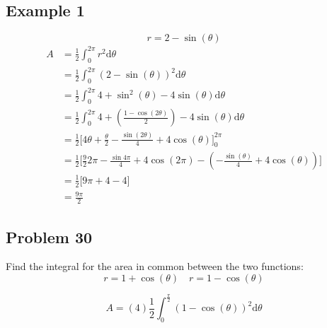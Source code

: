 \documentclass[letterpaper, 12pt]{article}
\newcommand*{\diff}{\mathrm{d}}
\begin{document}
\subsection*{Example 1}
\[ r = 2-\sin(\theta) \]
\begin{align*}
  A &= \frac{1}{2}\int_{0}^{2\pi}{r^{2}\diff{\theta}} \\
  &= \frac{1}{2}\int_{0}^{2\pi}{(2-\sin(\theta))^{2}\diff{\theta}} \\
  &= \frac{1}{2}\int_{0}^{2\pi}
    {4+\sin^{2}(\theta)-4\sin(\theta)\diff{\theta}} \\
  &= \frac{1}{2}\int_{0}^{2\pi}
    {4+(\frac{1-\cos(2\theta)}{2})-4\sin(\theta)\diff{\theta}} \\
  &= \frac{1}{2}\bigg[4\theta+\frac{\theta}{2}-
    \frac{\sin(2\theta)}{4}+4\cos(\theta)\bigg]_{0}^{2\pi} \\
  &= \frac{1}{2}\bigg[\frac{9}{2}{2\pi}-\frac{\sin{4\pi}}{4}+4\cos(2\pi)-
    (-\frac{\sin(\theta)}{4}+4\cos(\theta))\bigg] \\
  &= \frac{1}{2}\bigg[9\pi+4-4\bigg] \\
  &= \frac{9\pi}{2}
\end{align*}

\subsection*{Problem 30}
Find the integral for the area in common between the two functions:
\[ r = 1+\cos(\theta) \quad r = 1-\cos(\theta) \]
\begin{center}
\end{center}
\[ A = (4)\frac{1}{2}\int_{0}^{\frac{\pi}{2}}
   {(1-\cos(\theta))^{2}\diff{\theta}} \]
\end{document}
